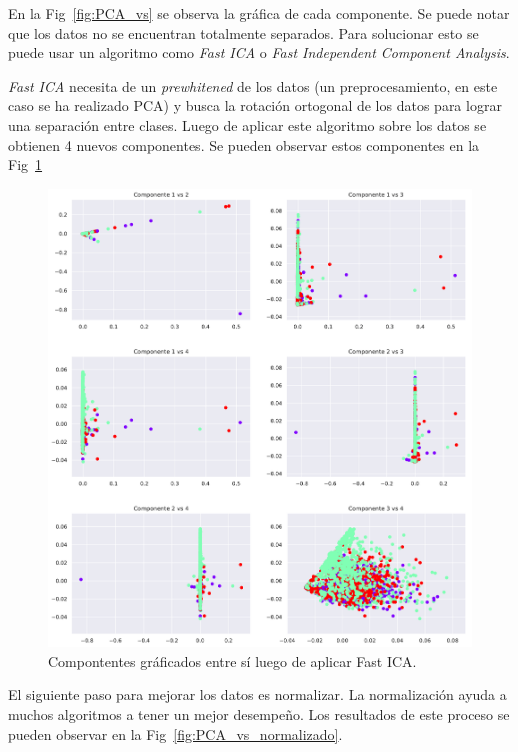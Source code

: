 En la Fig~\ref{fig:PCA_vs} se observa la gráfica de cada componente. Se puede notar que los datos no se encuentran totalmente separados. Para solucionar esto se puede usar un algoritmo como \textit{Fast ICA} o \textit{Fast Independent Component Analysis}.





\textit{Fast ICA} necesita de un \textit{prewhitened} de los datos (un preprocesamiento, en este caso se ha realizado PCA) y busca la rotación ortogonal de los datos para lograr una separación entre clases. Luego de aplicar este algoritmo sobre los datos se obtienen 4 nuevos componentes. Se pueden observar estos componentes en la Fig~\ref{fig:PCA_vs_separados}

\begin{figure}[hbt!]
\centering
\includegraphics[width=\textwidth]{PCA_vs_separados.pdf}
\caption{Compontentes gráficados entre sí luego de aplicar Fast ICA.}
\label{fig:PCA_vs_separados}
\end{figure}

El siguiente paso para mejorar los datos es normalizar. La normalización ayuda a muchos algoritmos a tener un mejor desempeño. Los resultados de este proceso se pueden observar en la Fig~\ref{fig:PCA_vs_normalizado}.

